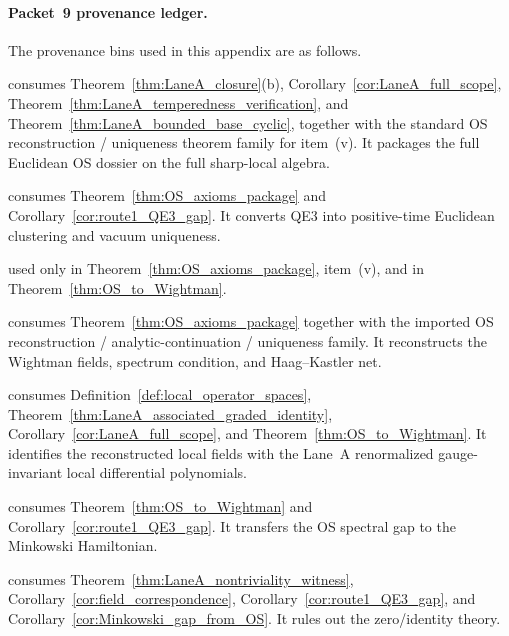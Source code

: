 \paragraph{Packet~9 provenance ledger.}
The provenance bins used in this appendix are as follows.
\begin{description}[leftmargin=2.2em,style=nextline]
\item[Theorem~\ref{thm:OS_axioms_package} (new endpoint):] consumes Theorem~\ref{thm:LaneA_closure}(b), Corollary~\ref{cor:LaneA_full_scope}, Theorem~\ref{thm:LaneA_temperedness_verification}, and Theorem~\ref{thm:LaneA_bounded_base_cyclic}, together with the standard OS reconstruction / uniqueness theorem family for item~(v). It packages the full Euclidean OS dossier on the full sharp-local algebra.
\item[Corollary~\ref{cor:OS_cluster_vacuum} (new reformulation):] consumes Theorem~\ref{thm:OS_axioms_package} and Corollary~\ref{cor:route1_QE3_gap}. It converts QE3 into positive-time Euclidean clustering and vacuum uniqueness.
\item[Standard OS reconstruction / uniqueness theorems~\cite{OS1,OS2} (imported background):] used only in Theorem~\ref{thm:OS_axioms_package}, item~(v), and in Theorem~\ref{thm:OS_to_Wightman}.
\item[Theorem~\ref{thm:OS_to_Wightman} (new endpoint):] consumes Theorem~\ref{thm:OS_axioms_package} together with the imported OS reconstruction / analytic-continuation / uniqueness family. It reconstructs the Wightman fields, spectrum condition, and Haag--Kastler net.
\item[Corollary~\ref{cor:field_correspondence} (new endpoint):] consumes Definition~\ref{def:local_operator_spaces}, Theorem~\ref{thm:LaneA_associated_graded_identity}, Corollary~\ref{cor:LaneA_full_scope}, and Theorem~\ref{thm:OS_to_Wightman}. It identifies the reconstructed local fields with the Lane~A renormalized gauge-invariant local differential polynomials.
\item[Corollary~\ref{cor:Minkowski_gap_from_OS} (new endpoint):] consumes Theorem~\ref{thm:OS_to_Wightman} and Corollary~\ref{cor:route1_QE3_gap}. It transfers the OS spectral gap to the Minkowski Hamiltonian.
\item[Theorem~\ref{thm:nontriviality_package} (new endpoint):] consumes Theorem~\ref{thm:LaneA_nontriviality_witness}, Corollary~\ref{cor:field_correspondence}, Corollary~\ref{cor:route1_QE3_gap}, and Corollary~\ref{cor:Minkowski_gap_from_OS}. It rules out the zero/identity theory.
\end{description}


